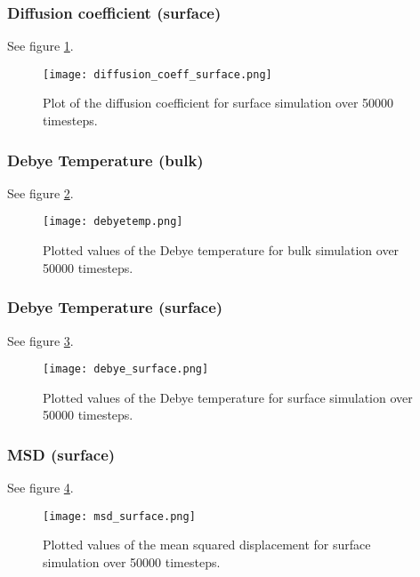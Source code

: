\subsubsection{Diffusion coefficient (surface)}
See figure \ref{diffsf}.\nopagebreak
\nopagebreak\begin{figure}[H]
	\centering
	\texttt{[image: diffusion\_coeff\_surface.png]}
	\caption{Plot of the diffusion coefficient for surface simulation over 50000 timesteps.}
	\label{diffsf}
\end{figure}


\subsubsection{Debye Temperature (bulk)}
See figure \ref{debye}.\nopagebreak
\nopagebreak\begin{figure}[H]
	\centering
	\texttt{[image: debyetemp.png]}
	\caption{Plotted values of the Debye temperature for bulk simulation over 50000 timesteps.}
	\label{debye}
\end{figure}

\subsubsection{Debye Temperature (surface)}
See figure \ref{debyesf}.\nopagebreak
\nopagebreak\begin{figure}[H]
	\centering
	\texttt{[image: debye\_surface.png]}
	\caption{Plotted values of the Debye temperature for surface simulation over 50000 timesteps.}
	\label{debyesf}
\end{figure}

\subsubsection{MSD (surface)}
See figure \ref{msdsf}.\nopagebreak
\nopagebreak\begin{figure}[H]
	\centering
	\texttt{[image: msd\_surface.png]}
	\caption{Plotted values of the mean squared displacement for surface simulation over 50000 timesteps.}
	\label{msdsf}
\end{figure}


